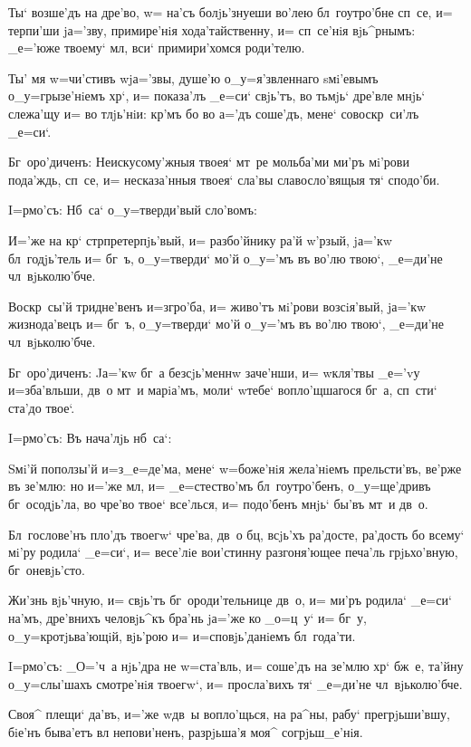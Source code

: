 Ты` возше'дъ на дре'во, w= на'съ болjь'знуеши во'лею 
бл~гоутро'бне сп~се, и= терпи'ши jа='зву, примире'нiя 
хода'тайственну, и= сп~се'нiя вjь^рнымъ: _е='юже твоему` 
мл, вси` примири'хомся роди'телю.

Ты' мя w=чи'стивъ w\т jа='звы, душе'ю о_у=я'звленнаго 
sмi'евымъ о_у=грызе'нiемъ хр`, и= показа'лъ _е=си` 
свjь'тъ, во тьмjь` дре'вле мнjь` слежа'щу и= во тлjь'нiи: 
кр'мъ бо во а='дъ соше'дъ, мене` совоскр~си'лъ 
_е=си`.

Бг~оро'диченъ: Неискусому'жныя твоея` мт~ре мольба'ми 
ми'ръ мi'рови пода'ждь, сп~се, и= несказа'нныя твоея` 
сла'вы славосло'вящыя тя` сподо'би.

 I=рмо'съ: Нб~са` о_у=тверди'вый сло'вомъ:

И='же на кр` стр претерпjь'вый, и= 
разбо'йнику ра'й w'рзый, jа='кw бл~годjь'тель и= 
бг~ъ, о_у=тверди` мо'й о_у='мъ въ во'лю твою`, _е=ди'не 
чл~вjьколю'бче.

Воскр~сы'й тридне'венъ и=з\ъ гро'ба, и= живо'тъ 
мi'рови возсiя'вый, jа='кw жизнода'вецъ и= бг~ъ, 
о_у=тверди` мо'й о_у='мъ въ во'лю твою`, _е=ди'не 
чл~вjьколю'бче.

Бг~оро'диченъ: Jа='кw бг~а безсjь'меннw заче'нши, и= 
w\т кля'твы _е='vу и=зба'вльши, дв~о мт~и марiа'мъ, моли` 
w\т тебе` вопло'щшагося бг~а, сп~сти` ста'до твое`.

 I=рмо'съ: Въ нача'лjь нб~са`:

Sмi'й поползы'й и=з\ъ _е=де'ма, мене` w=боже'нiя 
жела'нiемъ прельсти'въ, ве'рже въ зе'млю: но и='же 
мл, и= _е=стество'мъ бл~гоутро'бенъ, о_у=ще'дривъ 
бг~осодjь'ла, во чре'во твое` все'лься, и= подо'бенъ 
мнjь` бы'въ мт~и дв~о.

Бл~гослове'нъ пло'дъ твоегw` чре'ва, дв~о бц, 
всjь'хъ ра'досте, ра'дость бо всему` мi'ру родила` 
_е=си`, и= весе'лiе вои'стинну разгоня'ющее печа'ль 
грjьхо'вную, бг~оневjь'сто.

Жи'знь вjь'чную, и= свjь'тъ бг~ороди'тельнице дв~о, и= 
ми'ръ родила` _е=си` на'мъ, дре'внихъ человjь^къ бра'нь 
jа='же ко _о=ц~у` и= бг~у, о_у=кротjьва'ющiй, вjь'рою и= 
и=сповjь'данiемъ бл~года'ти.


I=рмо'съ: _О='ч~а нjь'дра не w=ста'вль, и= соше'дъ на 
зе'млю хр` бж~е, та'йну о_у=слы'шахъ смотре'нiя 
твоегw`, и= просла'вихъ тя` _е=ди'не чл~вjьколю'бче.

Своя^ плещи` да'въ, и='же w\т дв~ы вопло'щься, на 
ра^ны, рабу` прегрjьши'вшу, бiе'нъ быва'етъ вл 
непови'ненъ, разрjьша'я моя^ согрjьш_е'нiя.

